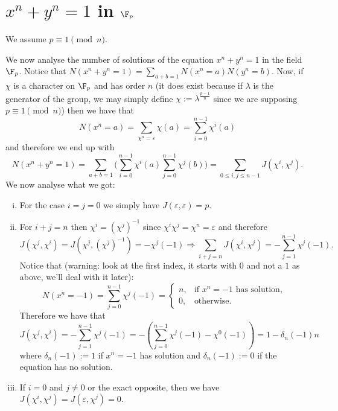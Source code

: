 \section{\texorpdfstring{\(x^n + y^n = 1\)}{xn + yn = 1} in
\texorpdfstring{\(\F_p\) }{F_p}}

\begin{remark}
   We assume \(p \equiv 1 \pmod{n}\).
\end{remark}

We now analyse the number of solutions of the equation \(x^n + y^n = 1\) in the
field \(\F_p\). Notice that  \(N(x^n + y^n = 1) = \sum_{a + b = 1} N(x^n =
a)N(y^n = b)\). Now, if \(\chi\) is a character on \(\F_p\) and has order 
\(n\) (it does exist because if \(\lambda\) is the generator of the group, we
may simply define \(\chi := \lambda^{\frac{p-1}{n}}\) since we are supposing
\(p\equiv 1 \pmod{n}\)) then we have that 
\[
   N(x^n = a) = \sum_{\chi^n = \varepsilon} \chi(a) = \sum_{i = 0}^{n-1}
   \chi^i(a)
\] 
and therefore we end up with 
\[
   N(x^n + y^n = 1) = \sum_{a+b=1} \bigg(\sum_{i = 0}^{n-1} \chi^i(a) \sum_{j =
   0}^{n-1} \chi^j(b)\bigg)
   = \sum_{0 \leqslant i, j \leqslant n-1 } J(\chi^i, \chi^j).
\] 
We now analyse what we got:  
\begin{enumerate}[i.]
   \item For the case \(i = j = 0\) we simply have \(J(\varepsilon, \varepsilon)
      = p\).
   \item For \(i + j = n\) then  \(\chi^i = (\chi^j)^{-1}\) since \(\chi^i
      \chi^j = \chi^n = \varepsilon\) and therefore 
      \[
         J(\chi^j, \chi^i) = J(\chi^j, (\chi^j)^{-1}) = - \chi^j(-1) \Rightarrow
         \sum_{i+j = n} J(\chi^i, \chi^j) = - \sum_{j = 1}^{n-1} \chi^j(-1).
      \] 
      Notice that (warning: look at the first index, it starts with \(0\) and
      not a \(1\) as above, we'll deal with it later):
      \[
         N(x^n = -1) = \sum_{j=0}^{n-1} \chi^j(-1) =
         \begin{cases}
            n, &\text{if } x^n = -1  \text{ has solution}, \\
            0, & \text{otherwise}.
         \end{cases}
      \] 
      Therefore we have that 
      \[
         J(\chi^j, \chi^i) = -\sum_{j=1}^{n-1} \chi^j(-1)
         = - \left( \sum_{j=0}^{n-1} \chi^j(-1) - \chi^0(-1) \right) 
         = 1 - \delta_n(-1)n
      \] 
      where \(\delta_n(-1) := 1\) if  \(x^n = -1\) has solution and
      \(\delta_n(-1) := 0\) if the equation has no solution. 
   \item If \(i = 0\) and \(j \neq 0\) or the exact opposite, then we have
      \(J(\chi^i, \chi^j) = J(\varepsilon, \chi^j) = 0\).
\end{enumerate}

